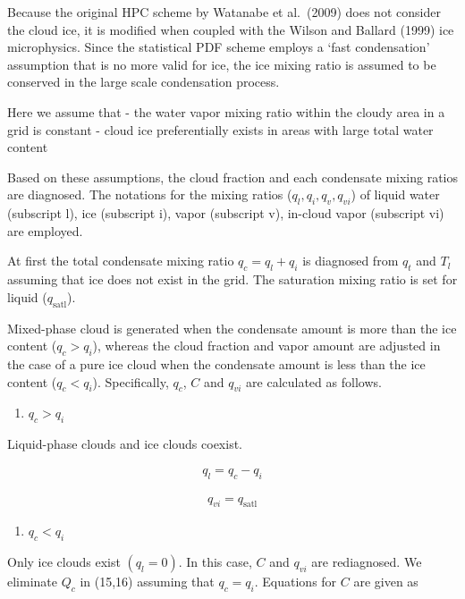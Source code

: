 Because the original HPC scheme by Watanabe et al.~(2009) does not
consider the cloud ice, it is modified when coupled with the Wilson and
Ballard (1999) ice microphysics. Since the statistical PDF scheme
employs a `fast condensation' assumption that is no more valid for ice,
the ice mixing ratio is assumed to be conserved in the large scale
condensation process.

Here we assume that - the water vapor mixing ratio within the cloudy
area in a grid is constant - cloud ice preferentially exists in areas
with large total water content

Based on these assumptions, the cloud fraction and each condensate
mixing ratios are diagnosed. The notations for the mixing ratios
(\(q_l, q_i, q_v, q_{vi}\)) of liquid water (subscript l), ice
(subscript i), vapor (subscript v), in-cloud vapor (subscript vi) are
employed.

At first the total condensate mixing ratio \(q_c=q_l+q_i\) is diagnosed
from \(q_t\) and \(T_l\) assuming that ice does not exist in the grid.
The saturation mixing ratio is set for liquid (\(q_{\text{satl}}\)).

Mixed-phase cloud is generated when the condensate amount is more than
the ice content (\(q_c>q_i\)), whereas the cloud fraction and vapor
amount are adjusted in the case of a pure ice cloud when the condensate
amount is less than the ice content (\(q_c<q_i\)). Specifically,
\(q_c\), \(C\) and \(q_{vi}\) are calculated as follows.

\begin{enumerate}
\def\labelenumi{\arabic{enumi}.}
\tightlist
\item
  \(q_c>q_i\)
\end{enumerate}

Liquid-phase clouds and ice clouds coexist.

\begin{eqnarray}
q_l= q_c-q_i
\end{eqnarray}

\begin{eqnarray}
q_{vi} = q_{\text{satl}}
\end{eqnarray}

\begin{enumerate}
\def\labelenumi{\arabic{enumi}.}
\setcounter{enumi}{1}
\tightlist
\item
  \(q_c<q_i\)
\end{enumerate}

Only ice clouds exist \((q_l=0)\). In this case, \(C\) and \(q_{vi}\)
are rediagnosed. We eliminate \(Q_c\) in (15,16) assuming that
\(q_c=q_i\). Equations for \(C\) are given as

